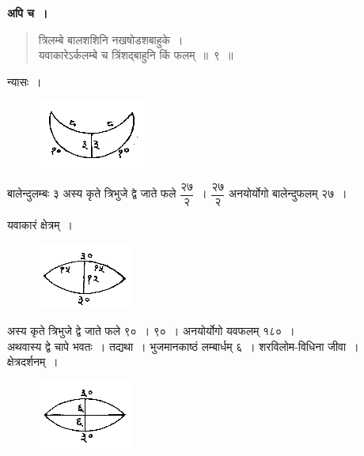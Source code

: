 \documentclass[11pt, openany]{book}
\begin{document}
\newpage
 \textbf{अपि च~।} 
\begin{quote}
    \bqt 
    त्रिलम्बे बालशशिनि नखषोडशबाहुके~।\\
यवाकारेऽर्कलम्बे च त्रिंशद्बाहुनि किं फलम्~॥~९~॥
\end{quote}

 न्यासः~। 
\vspace{-4mm}

\begin{figure}[h!]
    \centering
    \includegraphics[scale=0.7]{graphics/capture9.png}
\end{figure}

 बालेन्दुलम्बः ३ अस्य कृते त्रिभुजे द्वे जाते फले 
 $\dfrac{\mbox{२७}}{\mbox{२}}$~। $\dfrac{\mbox{२७}}{\mbox{२}}$
अनयोर्योगो बालेन्दुफलम् २७~। \\
\vspace{-2mm}

 यवाकारं क्षेत्रम्~। 
\vspace{-4mm}

\begin{figure}[h!]
    \centering
    \includegraphics[scale=0.7]{graphics/capture10.png}
\end{figure}

 अस्य कृते त्रिभुजे द्वे जाते फले ९०~। ९०~। अनयोर्योगो
यवफलम् १८०~। \\

\vspace{-4mm}
 अथवास्य द्वे चापे भवतः~। तद्यथा~। भुजमानकाष्ठं लम्बार्धम् ६~। शरविलोम-विधिना जीवा~। \\

\vspace{-2mm}
 क्षेत्रदर्शनम्~। 
\vspace{-4mm}

\begin{figure}[h!]
    \centering
    \includegraphics[scale=0.7]{graphics/capture11.png}
\captionsetup{labelformat=empty}
\end{figure}
\vspace{-4mm}
\end{document}
